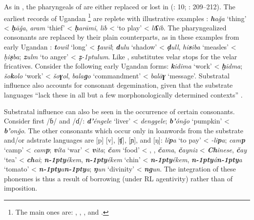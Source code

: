 \documentclass[output=paper]{langsci/langscibook}
\begin{document}
As in  , the {pharyngeals} of  are either replaced or lost in  (\citealt{Owens1985}: 10; \citealt{Wellens2003}: 209–212). The earliest records of Ugandan \footnote{The main ones are: \citet{Cook1905}, \citet{Jenkins1909}, \citet{Meldon1913}, and \citet{OwenKeane1915}.} are replete with illustrative examples \citep{Avram2017talk}: \textit{\textbf{h}aǧa} ‘thing’ <  \textit{\textbf{ḥ}āǧa}, \textit{aram} ‘thief’ <  \textit{\textbf{ḥ}arāmi}, \textit{līb} < ‘to play’ <  \textit{li\textbf{ʕ}ib}. The {pharyngealized} consonants are replaced by their plain counterparts, as in these examples from early Ugandan : \textit{\textbf{t}owil} ‘long’ <  \textit{\textbf{ṭ}awīl}; \textit{\textbf{d}ulu} ‘shadow’ <  \textit{\textbf{ḍ}ull}, \textit{hi\textbf{s}iba} ‘measles’ <  \textit{ḥi\textbf{ṣ}ba}; \textit{\textbf{z}ulm} ‘to anger’ <  \textit{\textbf{ẓ}\kern -1ptulum}. Like  ,  substitutes velar stops for the  velar fricatives. Consider the following early Ugandan  forms: \textit{\textbf{k}idima} ‘work’ <  \textit{\textbf{ḫ}idma}; \textit{šo\textbf{k}olo} ‘work’ <  \textit{šo\textbf{ɣ}ol}, \textit{bala\textbf{g}o} ‘commandment’ <  \textit{balā\textbf{ɣ}} ‘message’. Substratal influence also accounts for consonant {degemination}, given that the {substrate} languages “lack these in all but a few morphonologically determined contexts” \citep[162]{Owens1997}. 

Substratal influence can also be seen in the occurrence of certain consonants. Consider first /ɓ/ and /ɗ/:   \textit{\textbf{d'}éngele} ‘liver’ <  \textit{denggele};   \textit{\textbf{b'}ónǧo} ‘pumpkin’ <  \textit{\textbf{b'}onǧo}. The other consonants which occur only in {loanwords} from the {substrate} and/or {adstrate} languages are [p] [v], [ʧ], [ɲ], and [ŋ]:  \textit{lí\textbf{p}a} ‘to pay’ <  \textit{-li\textbf{p}a};  \textit{cam\textbf{p}} ‘camp’ <  \textit{cam\textbf{p}};  \textit{\textbf{v}íta} ‘war’ <  \textit{\textbf{v}ita};   \textit{\textbf{č}am} ‘food’ < , ,  \textit{\textbf{č}ama},   \textit{\textbf{č}ayniz} <  \textit{\textbf{Ch}inese},  \textit{\textbf{č}ay} ‘tea’ <  \textit{\textbf{ch}ai};   \textit{\textbf{n\kern -1pty}ékem},  \textit{\textbf{n\kern -1pty}ékem} ‘chin’ <  \textit{\textbf{n\kern -1pty}ékem},  \textit{\textbf{n\kern -1pty}á\textbf{n\kern -1pty}a} ‘tomato’ <  \textit{\textbf{n\kern -1pty}a\textbf{n\kern -1pty}a};   \textit{\textbf{ŋ}un} ‘divinity’ <  \textit{\textbf{ng}un}. The integration of these phonemes is thus a result of borrowing (under {RL} agentivity) rather than of {imposition}.
\end{document}

